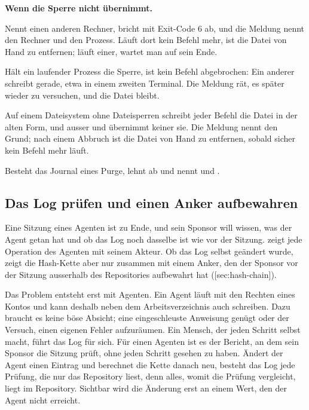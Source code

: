 {\startinfobox
{\bf Wenn  die Sperre nicht übernimmt.}
\startitemize
\item Nennt  einen anderen Rechner, bricht  mit Exit-Code 6 ab,
und die Meldung nennt den Rechner und den Prozess.
Läuft dort kein Befehl mehr, ist die Datei von Hand zu entfernen;
läuft einer, wartet man auf sein Ende.
\item Hält ein laufender Prozess die Sperre, ist kein Befehl abgebrochen:
Ein anderer schreibt gerade, etwa in einem zweiten Terminal.
Die Meldung rät, es später wieder zu versuchen, und die Datei bleibt.
\item Auf einem Dateisystem ohne Dateisperren schreibt jeder Befehl die Datei in der alten Form,
und ausser  und  übernimmt keiner sie.
Die Meldung nennt den Grund; nach einem Abbruch ist die Datei von Hand zu entfernen,
sobald sicher kein Befehl mehr läuft.
\item Besteht das Journal eines Purge, lehnt  ab und nennt
 und .
\stopitemize
\stopinfobox

\subsection[sec:verify-anchor]{Das Log prüfen und einen Anker aufbewahren}

Eine Sitzung eines Agenten ist zu Ende, und sein Sponsor will wissen,
was der Agent getan hat und ob das Log noch dasselbe ist wie vor der Sitzung.
 zeigt jede Operation des Agenten mit seinem Akteur.
Ob das Log selbst geändert wurde, zeigt die Hash-Kette aber nur zusammen mit einem Anker,
den der Sponsor vor der Sitzung ausserhalb des Repositories aufbewahrt hat
([sec:hash-chain]).

Das Problem entsteht erst mit Agenten.
Ein Agent läuft mit den Rechten eines Kontos und kann deshalb neben dem Arbeitsverzeichnis
auch  schreiben.
Dazu braucht es keine böse Absicht;
eine eingeschleuste Anweisung genügt oder der Versuch, einen eigenen Fehler aufzuräumen.
Ein Mensch, der jeden Schritt selbst macht, führt das Log für sich.
Für einen Agenten ist es der Bericht, an dem sein Sponsor die Sitzung prüft,
ohne jeden Schritt gesehen zu haben.
Ändert der Agent einen Eintrag und berechnet die Kette danach neu,
besteht das Log jede Prüfung, die nur das Repository liest,
denn alles, womit die Prüfung vergleicht, liegt im Repository.
Sichtbar wird die Änderung erst an einem Wert, den der Agent nicht erreicht.

}
